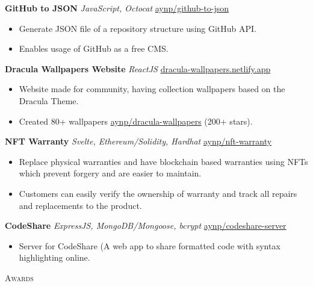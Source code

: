 \documentclass[a4paper]{article}
\newcommand{\lineunder} {
    \vspace*{-8pt} \\
    \hspace*{-18pt} \hrulefill \\
}
\newcommand{\header} [1] {
    {\hspace*{-18pt}\vspace*{6pt} \textsc{#1}}
    \vspace*{-6pt} \lineunder
}
\begin{document}
{\textbf{GitHub to JSON}} {\sl JavaScript, Octocat} \hfill \href{https://github.com/aynp/github-to-json}{aynp/github-to-json}\\
\begin{itemize}
	\item Generate JSON file of a repository structure using GitHub API.
	\item Enables usage of GitHub as a free CMS.
\end{itemize}
\vspace*{1.5mm}

{\textbf{Dracula Wallpapers Website}} {\sl ReactJS} \hfill \href{https://dracula-wallpapers.netlify.app/}{dracula-wallpapers.netlify.app}\\
\begin{itemize}
	\item Website made for community, having collection wallpapers based on the Dracula Theme.
	\item Created 80+ wallpapers \href{https://github.com/aynp/dracula-wallpapers}{aynp/dracula-wallpapers} (200+ stars).
\end{itemize}
\vspace*{1.5mm}

{\textbf{NFT Warranty}} {\sl Svelte, Ethereum/Solidity, Hardhat} \hfill \href{https://github.com/aynp/nft-warranty}{aynp/nft-warranty}\\
\begin{itemize}
	\item Replace physical warranties and have blockchain based warranties using NFTs which prevent forgery and are easier to maintain.
    \item Customers can easily verify the ownership of warranty and track all repairs and replacements to the product.
\end{itemize}
\vspace*{1.5mm}


{\textbf{CodeShare}} {\sl ExpressJS, MongoDB/Mongoose, bcrypt} \hfill \href{https://github.com/aynp/codeshare-server}{aynp/codeshare-server}\\
\begin{itemize}
	\item Server for CodeShare (A web app to share formatted code with syntax highlighting online.
\end{itemize}
\vspace*{1.5mm}



\header{Awards}
\vspace{1mm}
\end{document}
